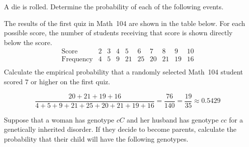 \documentclass[addpoints,12pt]{exam}
\begin{document}
\begin{questions}

\question[15] A die is rolled. Determine the probability
of each of the following events.

\question[10] The results of the first quiz in Math~104 are
shown in the table below. For each possible score, the number
of students receiving that score is shown directly below
the score.
\[\begin{array}{c|cccccccccc}
\text{Score}&2&3&4&5&6&7&8&9&10\\\hline
\text{Frequency}&4&5&9&21&25&20&21&19&16\\
\end{array}\]
Calculate the empirical probability that a randomly
selected Math~104 student scored $7$ or higher
on the first quiz.
\begin{solution}
\[\frac{20+21+19+16}{4+5+9+21+25+20+21+19+16}
=\frac{76}{140}=\frac{19}{35}\approx 0.5429\]
\end{solution}

\question[10]
Suppose that a woman has genotype $cC$
and her husband has genotype $cc$ for a
genetically inherited disorder.
If they decide to become parents, calculate the
probability that their child will
have the following genotypes.
\end{questions}
\end{document}
